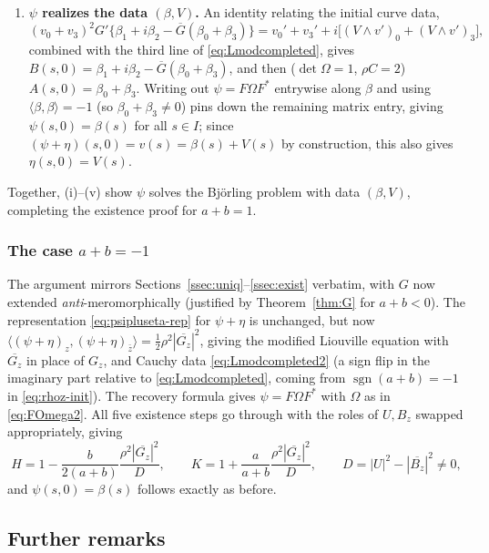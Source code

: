 \documentclass[11pt,a4paper]{article}
\newcommand{\ip}[2]{\langle #1,#2\rangle}            %
\newcommand{\sgn}{\operatorname{sgn}}
\theoremstyle{plain}
\theoremstyle{definition}
\theoremstyle{remark}
\begin{document}
\begin{enumerate}[label=(\roman*)]
\[  \]
  from which $2a(H-1)+b(K-1)=0$ holds identically.
\item \textbf{$\psi$ realizes the data $(\beta,V)$.} An identity relating
  the initial curve data,
  \begin{equation}\label{eq:init-prop}
    (v_0+v_3)^2 G'\big\{\beta_1+i\beta_2-\overline G(\beta_0+\beta_3)\big\}
      = v_0'+v_3'+i\big[(V\wedge v')_0+(V\wedge v')_3\big],
  \end{equation}
  combined with the third line of \eqref{eq:Lmodcompleted}, gives
  $B(s,0)=\beta_1+i\beta_2-\overline G(\beta_0+\beta_3)$, and then
  ($\det\Omega=1$, $\rho C=2$) $A(s,0)=\beta_0+\beta_3$. Writing out
  $\psi=F\Omega F^*$ entrywise along $\beta$ and using
  $\ip\beta\beta=-1$ (so $\beta_0+\beta_3\neq0$) pins down the remaining
  matrix entry, giving $\psi(s,0)=\beta(s)$ for all $s\in I$; since
  $(\psi+\eta)(s,0)=v(s)=\beta(s)+V(s)$ by construction, this also gives
  $\eta(s,0)=V(s)$.
\end{enumerate}
Together, (i)–(v) show $\psi$ solves the Björling problem with data
$(\beta,V)$, completing the existence proof for $a+b=1$.

\subsubsection{The case $a+b=-1$}\label{ssec:case-1}

The argument mirrors Sections~\ref{ssec:uniq}--\ref{ssec:exist} verbatim,
with $G$ now extended \emph{anti}-meromorphically (justified by
Theorem~\ref{thm:G} for $a+b<0$). The representation
\eqref{eq:psipluseta-rep} for $\psi+\eta$ is unchanged, but now
$\ip{(\psi+\eta)_z}{(\psi+\eta)_{\bar z}}=\tfrac12\rho^2|\overline{G_z}|^2$,
giving the modified Liouville equation with $\overline{G_z}$ in place of
$G_z$, and Cauchy data \eqref{eq:Lmodcompleted2} (a sign flip in the
imaginary part relative to \eqref{eq:Lmodcompleted}, coming from
$\sgn(a+b)=-1$ in \eqref{eq:rhoz-init}). The recovery formula gives
$\psi=F\Omega F^*$ with $\Omega$ as in \eqref{eq:FOmega2}. All five
existence steps go through with the roles of $U,B_z$ swapped
appropriately, giving
\[
  H = 1-\frac{b}{2(a+b)}\frac{\rho^2|\overline{G_z}|^2}{D}, \qquad
  K = 1+\frac{a}{a+b}\frac{\rho^2|\overline{G_z}|^2}{D}, \qquad
  D=|U|^2-|\overline{B_z}|^2\neq0,
\]
and $\psi(s,0)=\beta(s)$ follows exactly as before.

\subsection{Further remarks}\label{ssec:remarks}
\end{document}
